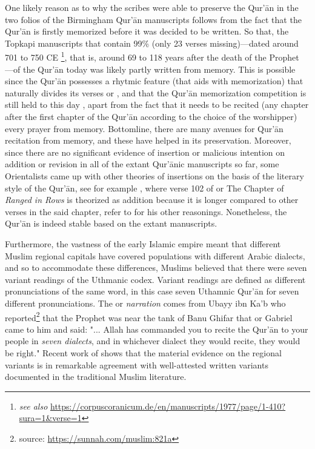 One likely reason as to why the scribes were able to preserve the Qur'\=an in the two folios of the Birmingham Qur'\=an manuscripts follows from the fact that the Qur'\=an is firstly memorized before it was decided to be written. So that, the \mbox{Topkapi} manuscripts that contain 99\% (only 23 verses missing)---dated around 701 to 750 CE \cite{karatay1962}\footnote{\textit{see also} \url{https://corpuscoranicum.de/en/manuscripts/1977/page/1-410?sura=1&verse=1}}, that is, around 69 to 118 years after the death of the Prophet ---of the Qur'\=an today was likely partly written from memory. This is possible since the Qur'\=an possesses a rhytmic feature (that aids with memorization) that naturally divides its verses or  , and that the Qur'\=an memorization competition is still held to this day \cite<as in the example of >{mb2022}, apart from the fact that it needs to be recited (any chapter after the first chapter of the Qur'\=an according to the choice of the worshipper) every prayer from memory. Bottomline, there are many avenues for Qur'\=an recitation from memory, and these have helped in its preservation. Moreover, since there are no significant evidence of insertion or malicious intention on addition or revision in all of the extant Qur'\=anic manuscripts so far, some Orientalists came up with other theories of insertions on the basis of the literary style of the Qur'\=an, see for example , where verse 102 of   or The Chapter of \textit{Ranged in Rows} is theorized as addition because it is longer compared to other verses in the said chapter, refer to  for his other reasonings. Nonetheless, the Qur'\=an is indeed stable based on the extant manuscripts.

Furthermore, the vastness of the early Islamic empire meant that different Muslim regional capitals have covered populations with different Arabic dialects, and so to accommodate these differences, Muslims believed that there were seven variant readings of the Uthmanic codex. Variant readings are defined as different pronunciations of the same word, in this case seven Uthamnic Qur'\=an for seven different pronunciations. The   or \textit{narration} comes from Ubayy ibn Ka'b  who reported\footnote{source: \url{https://sunnah.com/muslim:821a}} that the Prophet  was near the tank of Banu Ghifar that   or Gabriel came to him and said: "... Allah has commanded you to recite the Qur'\=an to your people in \textit{seven dialects}, and in whichever dialect they would recite, they would be right." Recent work of  shows that the material evidence on the regional variants is in remarkable agreement with well-attested written variants documented in the traditional Muslim literature.

